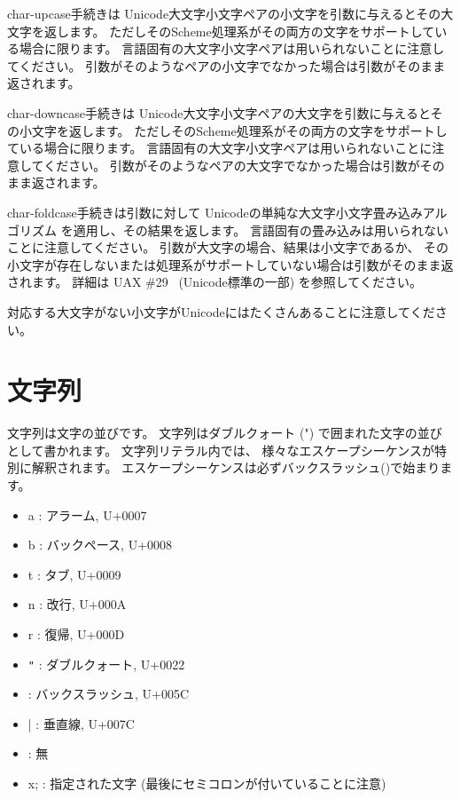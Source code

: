 \begin{entry}{%
}


{\cf char-upcase}手続きは
Unicode大文字小文字ペアの小文字を引数に与えるとその大文字を返します。
ただしそのScheme処理系がその両方の文字をサポートしている場合に限ります。
言語固有の大文字小文字ペアは用いられないことに注意してください。
引数がそのようなペアの小文字でなかった場合は引数がそのまま返されます。

{\cf char-downcase}手続きは
Unicode大文字小文字ペアの大文字を引数に与えるとその小文字を返します。
ただしそのScheme処理系がその両方の文字をサポートしている場合に限ります。
言語固有の大文字小文字ペアは用いられないことに注意してください。
引数がそのようなペアの大文字でなかった場合は引数がそのまま返されます。

{\cf char-foldcase}手続きは引数に対して
Unicodeの単純な大文字小文字畳み込みアルゴリズム
を適用し、その結果を返します。
言語固有の畳み込みは用いられないことに注意してください。
引数が大文字の場合、結果は小文字であるか、
その小文字が存在しないまたは処理系がサポートしていない場合は引数がそのまま返されます。
詳細は UAX \#29~\cite{uax29} (Unicode標準の一部) を参照してください。

対応する大文字がない小文字がUnicodeにはたくさんあることに注意してください。

\end{entry}


\section{文字列}
\label{stringsection}

文字列は文字の並びです。
\vest 文字列はダブルクォート ({\cf "}) で囲まれた文字の並びとして書かれます。
文字列リテラル内では、
様々なエスケープシーケンスが特別に解釈されます。
エスケープシーケンスは必ずバックスラッシュ(\backwhack{})で始まります。

\begin{itemize}
\item{\cf\backwhack{}a} : アラーム, U+0007
\item{\cf\backwhack{}b} : バックペース, U+0008 
\item{\cf\backwhack{}t} : タブ, U+0009 
\item{\cf\backwhack{}n} : 改行, U+000A 
\item{\cf\backwhack{}r} : 復帰, U+000D 
\item{\cf\backwhack{}}\verb|"| : ダブルクォート, U+0022 
\item{\cf\backwhack{}\backwhack{}} : バックスラッシュ, U+005C 
\item{\cf\backwhack{}|} : 垂直線, U+007C
\item{\cf\backwhack{}
      } : 無
\item{\cf\backwhack{}x;} : 指定された文字
(最後にセミコロンが付いていることに注意)
\end{itemize}

